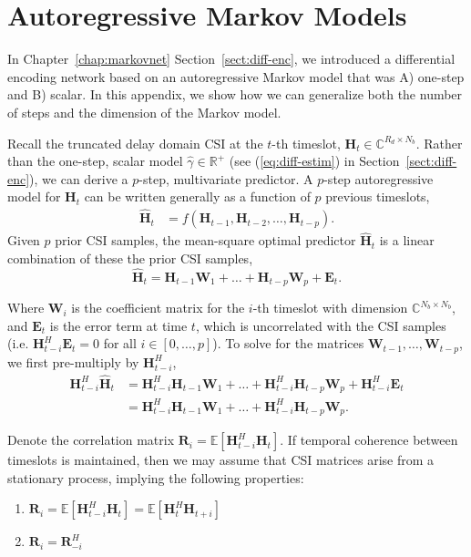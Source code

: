 \chapter{Autoregressive Markov Models}
\label{appdx:autoregressive}

In Chapter~\ref{chap:markovnet} Section~\ref{sect:diff-enc}, we introduced a differential encoding network based on an autoregressive Markov model that was A) one-step and B) scalar. In this appendix, we show how we can generalize both the number of steps and the dimension of the Markov model.

Recall the truncated delay domain CSI at the $t$-th timeslot, $\mathbf{H}_{t}\in\mathbb{C}^{R_d \times N_b}$. Rather than the one-step, scalar model $\hat\gamma \in \mathbb R^+$ (see (\ref{eq:diff-estim}) in Section~\ref{sect:diff-enc}), we can derive a $p$-step, multivariate predictor. A $p$-step autoregressive model for $\mathbf{H}_t$ can be written generally as a function of $p$ previous timeslots,
\begin{align*}
	\hat{\mathbf{H}}_t &= f(\mathbf{H}_{t-1}, \mathbf{H}_{t-2}, \dots, \mathbf{H}_{t-p}).
\end{align*}
Given $p$ prior CSI samples, the mean-square optimal predictor $\hat{\mathbf{H}}_t$ is a linear combination of these the prior CSI samples,
\begin{equation}
\mathbf{\hat H}_{t} = \mathbf{H}_{t-1} \mathbf W_{1} + \dots + \mathbf{H}_{t-p} \mathbf W_{p} + \mathbf E_t.
\end{equation}

Where $\mathbf{W}_{i}$ is the coefficient matrix for the $i$-th timeslot with dimension $\mathbb{C}^{N_b \times N_b}$, and $\mathbf{E}_t$ is the error term at time $t$, which is uncorrelated with the CSI samples (i.e. $\mathbf H_{t-i}^H \mathbf E_t = 0$ for all $i \in [0, \dots, p]$). To solve for the matrices $\mathbf{W}_{t-1}, \dots, \mathbf{W}_{t-p}$, we first pre-multiply by $\mathbf H_{t-i}^H$,
\begin{align}
\mathbf{H}_{t-i}^H\mathbf{\hat H}_{t} &= \mathbf{H}_{t-i}^H\mathbf{H}_{t-1} \mathbf W_{1} + \dots + \mathbf{H}_{t-i}^H\mathbf{H}_{t-p} \mathbf W_{p} + \mathbf{H}_{t-i}^H\mathbf E_t \nonumber \\
                    &= \mathbf{H}_{t-i}^H\mathbf{H}_{t-1} \mathbf W_{1} + \dots + \mathbf{H}_{t-i}^H\mathbf{H}_{t-p} \mathbf W_{p}. \label{eq:var-init}
\end{align}

Denote the correlation matrix 
$\mathbf R_i = \mathbb E [\mathbf H^H_{t-i}\mathbf H_{t}]$. If temporal coherence between timeslots is maintained, then we may assume that CSI matrices arise from a stationary process, implying the following properties:
\begin{enumerate}
  \item $\mathbf R_i = \mathbb E [\mathbf H^H_{t-i}\mathbf H_{t}] = \mathbb E [\mathbf H^H_{t}\mathbf H_{t+i}]$
  \item $\mathbf R_i = \mathbf R^H_{-i}$
\end{enumerate}

